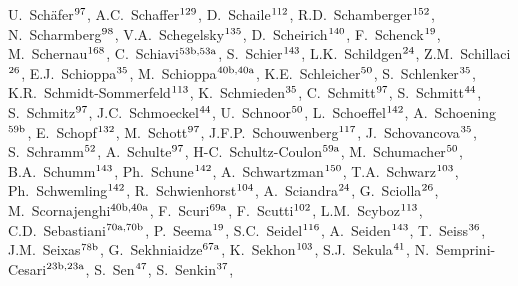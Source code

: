 \begin{flushleft}
U.~Sch\"afer$^\textrm{\scriptsize 97}$,    
A.C.~Schaffer$^\textrm{\scriptsize 129}$,    
D.~Schaile$^\textrm{\scriptsize 112}$,    
R.D.~Schamberger$^\textrm{\scriptsize 152}$,    
N.~Scharmberg$^\textrm{\scriptsize 98}$,    
V.A.~Schegelsky$^\textrm{\scriptsize 135}$,    
D.~Scheirich$^\textrm{\scriptsize 140}$,    
F.~Schenck$^\textrm{\scriptsize 19}$,    
M.~Schernau$^\textrm{\scriptsize 168}$,    
C.~Schiavi$^\textrm{\scriptsize 53b,53a}$,    
S.~Schier$^\textrm{\scriptsize 143}$,    
L.K.~Schildgen$^\textrm{\scriptsize 24}$,    
Z.M.~Schillaci$^\textrm{\scriptsize 26}$,    
E.J.~Schioppa$^\textrm{\scriptsize 35}$,    
M.~Schioppa$^\textrm{\scriptsize 40b,40a}$,    
K.E.~Schleicher$^\textrm{\scriptsize 50}$,    
S.~Schlenker$^\textrm{\scriptsize 35}$,    
K.R.~Schmidt-Sommerfeld$^\textrm{\scriptsize 113}$,    
K.~Schmieden$^\textrm{\scriptsize 35}$,    
C.~Schmitt$^\textrm{\scriptsize 97}$,    
S.~Schmitt$^\textrm{\scriptsize 44}$,    
S.~Schmitz$^\textrm{\scriptsize 97}$,    
J.C.~Schmoeckel$^\textrm{\scriptsize 44}$,    
U.~Schnoor$^\textrm{\scriptsize 50}$,    
L.~Schoeffel$^\textrm{\scriptsize 142}$,    
A.~Schoening$^\textrm{\scriptsize 59b}$,    
E.~Schopf$^\textrm{\scriptsize 132}$,    
M.~Schott$^\textrm{\scriptsize 97}$,    
J.F.P.~Schouwenberg$^\textrm{\scriptsize 117}$,    
J.~Schovancova$^\textrm{\scriptsize 35}$,    
S.~Schramm$^\textrm{\scriptsize 52}$,    
A.~Schulte$^\textrm{\scriptsize 97}$,    
H-C.~Schultz-Coulon$^\textrm{\scriptsize 59a}$,    
M.~Schumacher$^\textrm{\scriptsize 50}$,    
B.A.~Schumm$^\textrm{\scriptsize 143}$,    
Ph.~Schune$^\textrm{\scriptsize 142}$,    
A.~Schwartzman$^\textrm{\scriptsize 150}$,    
T.A.~Schwarz$^\textrm{\scriptsize 103}$,    
Ph.~Schwemling$^\textrm{\scriptsize 142}$,    
R.~Schwienhorst$^\textrm{\scriptsize 104}$,    
A.~Sciandra$^\textrm{\scriptsize 24}$,    
G.~Sciolla$^\textrm{\scriptsize 26}$,    
M.~Scornajenghi$^\textrm{\scriptsize 40b,40a}$,    
F.~Scuri$^\textrm{\scriptsize 69a}$,    
F.~Scutti$^\textrm{\scriptsize 102}$,    
L.M.~Scyboz$^\textrm{\scriptsize 113}$,    
C.D.~Sebastiani$^\textrm{\scriptsize 70a,70b}$,    
P.~Seema$^\textrm{\scriptsize 19}$,    
S.C.~Seidel$^\textrm{\scriptsize 116}$,    
A.~Seiden$^\textrm{\scriptsize 143}$,    
T.~Seiss$^\textrm{\scriptsize 36}$,    
J.M.~Seixas$^\textrm{\scriptsize 78b}$,    
G.~Sekhniaidze$^\textrm{\scriptsize 67a}$,    
K.~Sekhon$^\textrm{\scriptsize 103}$,    
S.J.~Sekula$^\textrm{\scriptsize 41}$,    
N.~Semprini-Cesari$^\textrm{\scriptsize 23b,23a}$,    
S.~Sen$^\textrm{\scriptsize 47}$,    
S.~Senkin$^\textrm{\scriptsize 37}$,    

\end{flushleft}
